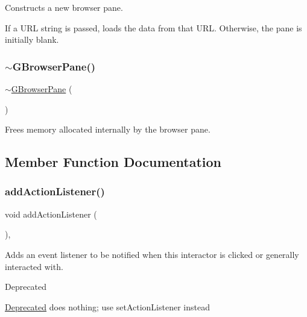 Constructs a new browser pane. 

If a U\+RL string is passed, loads the data from that U\+RL. Otherwise, the pane is initially blank. \mbox{\label{classGBrowserPane_ad2b090c6d23fd1019afa2a16e9eb1680}} 
\subsubsection{\texorpdfstring{$\sim$\+G\+Browser\+Pane()}{~GBrowserPane()}}
{\footnotesize\ttfamily $\sim$\mbox{\hyperlink{classGBrowserPane}{G\+Browser\+Pane}} (\begin{DoxyParamCaption}{ }\end{DoxyParamCaption})\hspace{0.3cm}{\ttfamily [override]}}



Frees memory allocated internally by the browser pane. 



\subsection{Member Function Documentation}
\mbox{\label{classGInteractor_a02f20ea6edfa0671f31c4c648a253833}} 
\subsubsection{\texorpdfstring{add\+Action\+Listener()}{addActionListener()}}
{\footnotesize\ttfamily void add\+Action\+Listener (\begin{DoxyParamCaption}{ }\end{DoxyParamCaption})\hspace{0.3cm}{\ttfamily [virtual]}, {\ttfamily [inherited]}}



Adds an event listener to be notified when this interactor is clicked or generally interacted with. 

\begin{DoxyRefDesc}{Deprecated}
\item[\mbox{\hyperlink{deprecated__deprecated000006}{Deprecated}}]does nothing; use set\+Action\+Listener instead \end{DoxyRefDesc}
\mbox{\label{classGObservable_a80cfa040459ff53594adbd6a51ec8f43}} 
